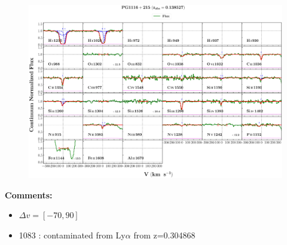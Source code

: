 \documentclass[12pt]{report}
\newcommand\ion[2]{\text{#1\,\textsc{\lowercase{#2}}}}
\begin{document}
\begin{landscape}

    \begin{figure}
        \centering
        \vspace{-20mm}
        \hspace*{-35mm}
        \includegraphics[width=1.25\linewidth]{sys_plots_full/PG1116+215_z=0.138527_sys_plot_full.png}
    \end{figure}
    
\end{landscape}


\textbf{Comments:}

\begin{itemize}
    \item $\Delta v = [-70,90]$
    \item \ion{N}{ii} 1083 : contaminated from Ly$\alpha$ from z=0.304868
\end{itemize}
\end{document}
